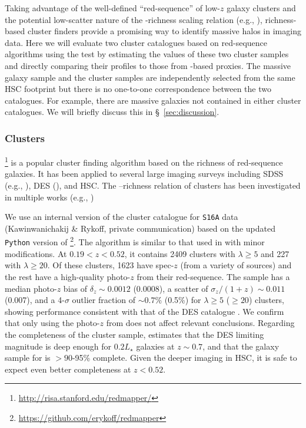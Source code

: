 \documentclass[fleqn,usenatbib,useAMS]{mnras}
\begin{document}
\begin{CJK*}{UTF8}{gbsn}
    Taking advantage of the well-defined ``red-sequence'' of low-$z$ galaxy clusters and the
    potential low-scatter nature of the \mvir{}-richness scaling relation (e.g., \citealt{Rozo2009,
    Rykoff2012}), richness-based cluster finders provide a promising way to identify massive halos
    in imaging data.
    Here we will evaluate two cluster catalogues based on red-sequence algorithms using the \topn{}
    test by estimating the \sigmvir{} values of these two cluster samples and directly comparing
    their \dsigma{} profiles to those from \mstar{}-based \mvir{} proxies.
    The massive galaxy sample and the cluster samples are independently selected from the same 
    HSC footprint but there is no one-to-one correspondence between the two catalogues. 
    For example, there are massive galaxies not contained in either cluster catalogues. 
    We will briefly discuss this in \S\ \ref{sec:discussion}.
    
\subsubsection{\redm{} Clusters}
    \label{sec:cluster_redmapper}

    \redm{} \citep{Rykoff2014, Rozo2014, Rozo2015a, Rozo2015b}
    \footnote{\url{http://risa.stanford.edu/redmapper/}} is a popular cluster finding algorithm
    based on the richness of red-sequence galaxies.
    It has been applied to several large imaging surveys including SDSS (e.g.,
    \citealt{Rykoff2014}), DES (\citealt{Rykoff2016, McClintock2019}), and HSC.
    The \mvir{}--richness relation of \redm{} clusters has been investigated in multiple
    works (e.g., \citealt{Saro2015, Farahi2016, Simet2017, Melchior2017, Baxter2018, Murata2018,
    McClintock2019})

    We use an internal version of the \redm{} cluster catalogue for \texttt{S16A} data
    (Kawinwanichakij \& Rykoff, private communication) based on the updated \texttt{Python} version
    of \redm{}\footnote{\url{https://github.com/erykoff/redmapper}}.
    The algorithm is similar to that used in \citet{Rykoff2016} with minor modifications.
    At $0.19 < z < 0.52$, it contains 2409 clusters with $\lambda \geq 5$ and 227 with $\lambda \geq
    20$.
    Of these clusters, 1623 have spec-$z$ (from a variety of sources) and the rest have a
    high-quality photo-$z$ from their red-sequence.
    The sample has a median photo-$z$ bias of $\delta_{z} \sim 0.0012$ (0.0008), a scatter of
    $\sigma_{z}/(1 + z) \sim 0.011$ (0.007), and a 4-$\sigma$ outlier fraction of $\sim 0.7$\%
    (0.5\%) for $\lambda \geq 5$ ($\geq 20$) clusters, showing performance consistent with that of
    the DES catalogue \citep{McClintock2019}.
    We confirm that only using the photo-$z$ from \redm{} does not affect relevant conclusions.
    Regarding the completeness of the cluster sample, \citet{McClintock2019} estimates that
    the DES limiting magnitude is deep enough for $0.2 L_{\star}$ galaxies at $z \sim 0.7$,
    and that the galaxy sample for \redm{} is $>90$-95\% complete.
    Given the deeper imaging in HSC, it is safe to expect even better completeness at $z<0.52$.


\end{CJK*}
\end{document}
